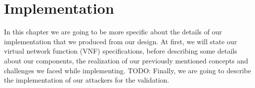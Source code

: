 \chapter{Implementation}
\iffalse
\begin{itemize}
    \item Specification
    \begin{itemize}
        \item OpenAPI REST specifications
        \item Communication
        \begin{itemize}
            \item Slice creation
            \item Slice removal
        \end{itemize}
    \end{itemize}
    \item Components
    \begin{itemize}
        \item Implemented in python using auto-generated code by OpenAPI
        \item Interconnected via testbed + real-world hardware integration
        \item TODO: What is missing from design to reproduce implementation?
    \end{itemize}
    \item Concepts
    \begin{itemize}
        \item Same as in design - specify their implementation
    \end{itemize}
    \item Challenges
    \begin{itemize}
        \item MTU restriction
        \item MPLS label popping
        \item iptables bridge skip
        \item offload disabling
    \end{itemize}
    \item Attackers
    \begin{itemize}
        \item Specify how the individual attackers from the methodology were implemented
    \end{itemize}
\end{itemize}
\fi

In this chapter we are going to be more specific about the details of our implementation that we produced from our design. At first, we will state our virtual network function (VNF) specifications, before describing some details about our components, the realization of our previously mentioned concepts and challenges we faced while implementing. TODO: Finally, we are going to describe the implementation of our attackers for the validation.

